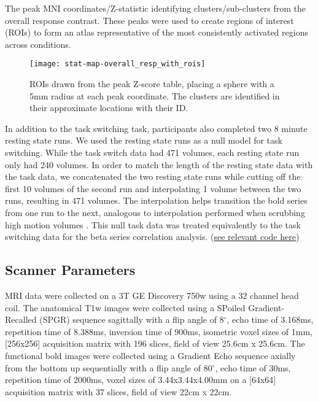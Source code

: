 \documentclass[10pt,letterpaper]{article}
\begin{document}
\begin{table}[H]
  \caption{
    The peak MNI coordinates/Z-statistic identifying clusters/sub-clusters from the overall
    response contrast.
    These peaks were used to create regions of interest (ROIs) to form an atlas representative
    of the most consistently activated regions across conditions.
  }
  \label{table:clusters}
\end{table}


\begin{figure}[H]
  \centering
  \texttt{[image: stat-map-overall\_resp\_with\_rois]}
  \caption{
    ROIs drawn from the peak Z-score table, placing a sphere with a 5mm radius
    at each peak coordinate.
    The clusters are identified in their approximate locations
    with their ID.
  }
  \label{fig:methroimap}
\end{figure}

In addition to the task switching task, participants also completed
two 8 minute resting state runs.
We used the resting state runs as a null model for task switching.
While the task switch data had 471 volumes, each resting state run only had
240 volumes.
In order to match the length of the resting state data with the task data, we concatenated
the two resting state runs while cutting off the first 10 volumes of the second run
and interpolating 1 volume between the two runs, resulting in 471 volumes.
The interpolation helps transition the bold series from one run to the next,
analogous to interpolation performed when scrubbing high motion volumes \cite{Power2014a}. 
This null task data was treated equivalently to the task switching data for the
beta series correlation analysis.
(\href{https://github.com/jdkent/validateBetaSeries/tree/195ad5b4201971038dbbf8f73a3c537caf032743}{see relevant code here})

\subsection*{Scanner Parameters}
\label{methods:scanner}

MRI data were collected on a 3T GE Discovery 750w using a 32 channel head coil.
The anatomical T1w images were collected using a SPoiled Gradient-Recalled (SPGR) sequence
sagittally with a flip angle of 8$^{\circ}$, echo time of 3.168ms,
repetition time of 8.388ms, inversion time of 900ms, isometric voxel sizes of 1mm,
[256x256] acquisition matrix with 196 slices, field of view 25.6cm x 25.6cm.
The functional bold images were collected using a Gradient Echo sequence axially from
the bottom up sequentially with a flip angle of 80$^{\circ}$, echo time of 30ms,
repetition time of 2000ms, voxel sizes of 3.44x3.44x4.00mm on a [64x64] acquisition matrix
with 37 slices, field of view 22cm x 22cm.
\end{document}
